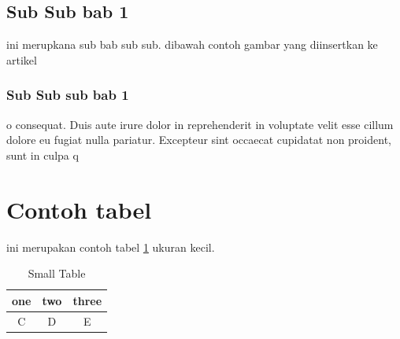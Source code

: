 \subsection{Sub Sub bab 1}
ini merupkana sub bab sub sub. dibawah contoh gambar yang diinsertkan ke artikel
\subsubsection{Sub Sub sub bab 1}
o consequat. Duis aute irure dolor in reprehenderit in voluptate velit esse cillum dolore eu fugiat nulla pariatur. Excepteur sint occaecat cupidatat non proident, sunt in culpa q
\section{Contoh tabel}
ini merupakan contoh tabel \ref{table:contoh} ukuran kecil.
\begin{table}[h]
\caption{Small Table}
\centering
\begin{tabular}{ccc}
\hline
one&two&three\\
\hline
C&D&E\\
\hline
\end{tabular}
\label{table:contoh}
\end{table}
